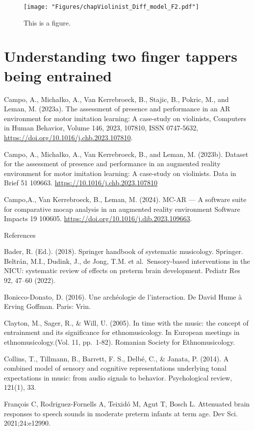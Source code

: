 \documentclass[
]{book}
\theoremstyle{definition}
\theoremstyle{definition}
\theoremstyle{definition}
\theoremstyle{definition}
\theoremstyle{remark}
\begin{document}
\begin{figure}
  \texttt{[image: "Figures/chapViolinist\_Diff\_model\_F2.pdf"]}
  \caption{This is a figure.}
\end{figure}

\hypertarget{chapEntrainment}{%
\chapter{Understanding two finger tappers being entrained}\label{chapEntrainment}}

Campo, A., Michałko, A., Van Kerrebroeck, B., Stajic, B., Pokric, M., and Leman, M. (2023a). The assessment of presence and performance in an AR environment for motor imitation learning: A case-study on violinists, Computers in Human Behavior, Volume 146, 2023, 107810, ISSN 0747-5632, \url{https://doi.org/10.1016/j.chb.2023.107810}.

Campo, A., Michałko, A., Van Kerrebroeck, B., and Leman, M. (2023b).
Dataset for the assessment of presence and performance in an augmented reality environment for motor imitation learning: A case-study on violinists. Data in Brief 51 109663.
\url{https://10.1016/j.chb.2023.107810}

Campo,A., Van Kerrebroeck, B., Leman, M. (2024).
MC-AR --- A software suite for comparative mocap analysis in an augmented reality environment
Software Impacts 19 100605. \url{https://doi.org/10.1016/j.dib.2023.109663}.

References

Bader, R. (Ed.). (2018). Springer handbook of systematic musicology. Springer.
Beltrán, M.I., Dudink, J., de Jong, T.M. et al.~Sensory-based interventions in the NICU: systematic review of effects on preterm brain development. Pediatr Res 92, 47--60 (2022).

Bonicco-Donato, D. (2016). Une archéologie de l'interaction. De David Hume à Erving Goffman. Paris: Vrin.

Clayton, M., Sager, R., \& Will, U. (2005). In time with the music: the concept of entrainment and its significance for ethnomusicology. In European meetings in ethnomusicology.(Vol. 11, pp.~1-82). Romanian Society for Ethnomusicology.

Collins, T., Tillmann, B., Barrett, F. S., Delbé, C., \& Janata, P. (2014). A combined model of sensory and cognitive representations underlying tonal expectations in music: from audio signals to behavior. Psychological review, 121(1), 33.

François C, Rodriguez-Fornells A, Teixidó M, Agut T, Bosch L. Attenuated brain responses to speech sounds in moderate preterm infants at term age. Dev Sci. 2021;24:e12990.
\end{document}
